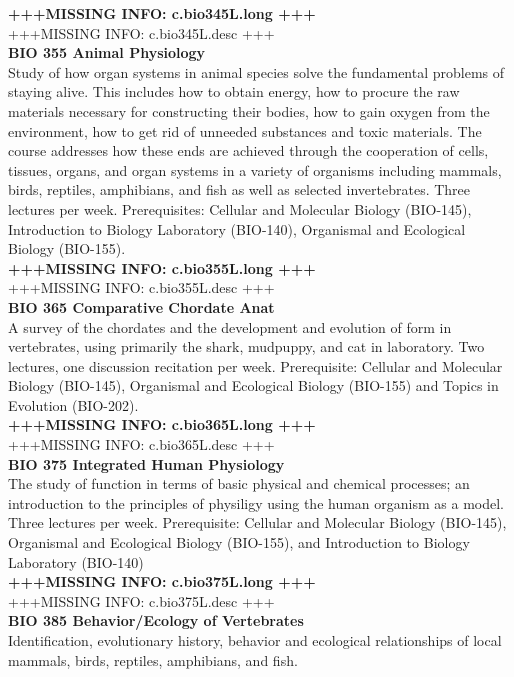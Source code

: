 \documentclass[
  letterpaper,
]{scrbook}
\begin{document}
\textbf{+++MISSING INFO: c.bio345L.long +++}\\
+++MISSING INFO: c.bio345L.desc +++\\
\textbf{BIO 355 Animal Physiology}\\
Study of how organ systems in animal species solve the fundamental
problems of staying alive. This includes how to obtain energy, how to
procure the raw materials necessary for constructing their bodies, how
to gain oxygen from the environment, how to get rid of unneeded
substances and toxic materials. The course addresses how these ends are
achieved through the cooperation of cells, tissues, organs, and organ
systems in a variety of organisms including mammals, birds, reptiles,
amphibians, and fish as well as selected invertebrates. Three lectures
per week. Prerequisites: Cellular and Molecular Biology (BIO-145),
Introduction to Biology Laboratory (BIO-140), Organismal and Ecological
Biology (BIO-155).\\
\textbf{+++MISSING INFO: c.bio355L.long +++}\\
+++MISSING INFO: c.bio355L.desc +++\\
\textbf{BIO 365 Comparative Chordate Anat}\\
A survey of the chordates and the development and evolution of form in
vertebrates, using primarily the shark, mudpuppy, and cat in laboratory.
Two lectures, one discussion recitation per week. Prerequisite: Cellular
and Molecular Biology (BIO-145), Organismal and Ecological Biology
(BIO-155) and Topics in Evolution (BIO-202).\\
\textbf{+++MISSING INFO: c.bio365L.long +++}\\
+++MISSING INFO: c.bio365L.desc +++\\
\textbf{BIO 375 Integrated Human Physiology}\\
The study of function in terms of basic physical and chemical processes;
an introduction to the principles of physiligy using the human organism
as a model. Three lectures per week. Prerequisite: Cellular and
Molecular Biology (BIO-145), Organismal and Ecological Biology
(BIO-155), and Introduction to Biology Laboratory (BIO-140)\\
\textbf{+++MISSING INFO: c.bio375L.long +++}\\
+++MISSING INFO: c.bio375L.desc +++\\
\textbf{BIO 385 Behavior/Ecology of Vertebrates}\\
Identification, evolutionary history, behavior and ecological
relationships of local mammals, birds, reptiles, amphibians, and fish.
\end{document}
